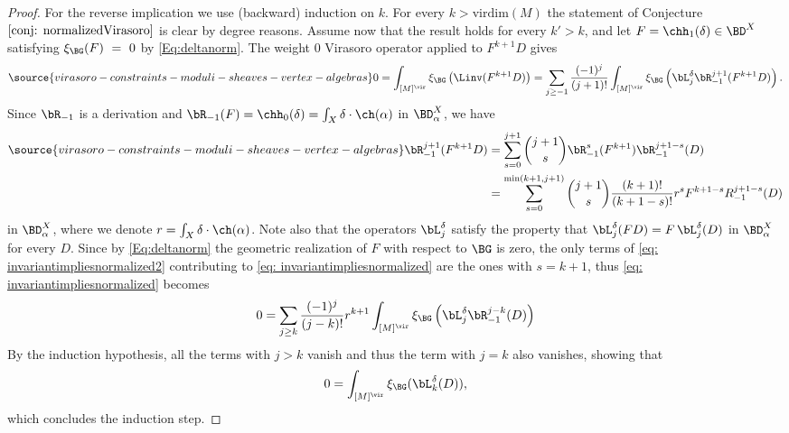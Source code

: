 \begin{proof}
For the reverse implication we use (backward) induction on $k$. For every $k>\mathrm{virdim}(M)$ the statement of Conjecture $\ref{conj: normalizedVirasoro}$ is clear by degree reasons. Assume now that the result holds for every $k'>k$, and let $F=\chh_1(\delta)\in \BD^X$ satisfying $\xi_\BG(F)~=~0$ by \eqref{Eq:deltanorm}. The weight 0 Virasoro operator applied to $F^{k+1}D$ gives
\begin{equation}\label{eq: invariantimpliesnormalized}
\source{virasoro-constraints-moduli-sheaves-vertex-algebras}
0=\int_{[M]^\vir} \xi_{\BG}\left(\Linv(F^{k+1}D)\right)=\sum_{j\geq -1}\frac{(-1)^j}{(j+1)!}\int_{[M]^\vir}\xi_{\BG}\left(\bL_j^\delta \bR_{-1}^{j+1}(F^{k+1}D)\right).
\end{equation}
Since $\bR_{-1}$ is a derivation and $\bR_{-1}(F)=\chh_0(\delta)=\int_X \delta\cdot \ch(\alpha)$ in $\BD^{X}_\alpha$, we have
\begin{align}\label{eq: invariantimpliesnormalized2}
\source{virasoro-constraints-moduli-sheaves-vertex-algebras}
\nonumber \bR_{-1}^{j+1}(F^{k+1}D)&=\sum_{s=0}^{j+1} \binom{j+1}{s}\bR_{-1}^s(F^{k+1})\bR_{-1}^{j+1-s}(D)\\
&=\sum_{s=0}^{\min(k+1, j+1)}\binom{j+1}{s}\frac{(k+1)!}{(k+1-s)!}r^s F^{k+1-s}R_{-1}^{j+1-s}(D)
\end{align}
in $\BD^{X}_{\alpha}$, where we denote $r=\int_X \delta\cdot \ch(\alpha)$. Note also that the operators $\bL_j^\delta$ satisfy the property that $\bL_{j}^\delta(F D)=F \,\bL_{j}^\delta(D)$ in $\BD^{X}_\alpha$ for every $D$. Since by \eqref{Eq:deltanorm} the geometric realization of $F$ with respect to $\BG$ is zero, the only terms of \eqref{eq: invariantimpliesnormalized2} contributing to \eqref{eq: invariantimpliesnormalized} are the ones with $s=k+1$, thus  \eqref{eq: invariantimpliesnormalized} becomes
\[0=\sum_{j\geq k}\frac{(-1)^j}{(j-k)!} r^{k+1}\int_{[M]^\vir}\xi_{\BG}\left(\bL_j^\delta \bR_{-1}^{j-k}(D)\right)\]
By the induction hypothesis, all the terms with $j>k$ vanish and thus the term with $j=k$ also vanishes, showing that
\[0=\int_{[M]^\vir} \xi_{\BG}(\bL_k^\delta(D)),\]
which concludes the induction step.\qedhere
\end{proof}

